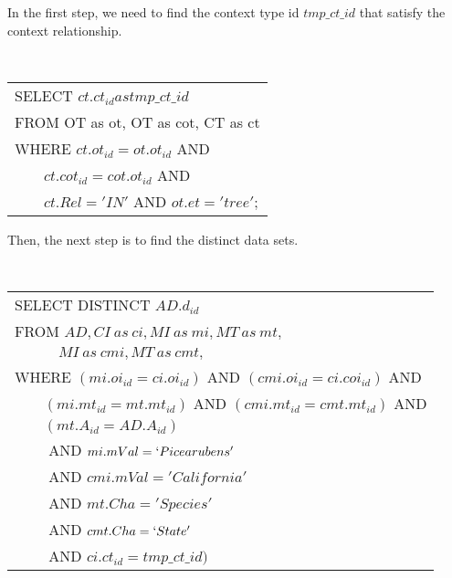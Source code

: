 
In the first step, we need to find the context type id $tmp\_ct\_id$
that satisfy the context relationship.

{\tt
\begin{tabular}{l}
SELECT $ct.ct_{id} as tmp\_ct\_id$\\
FROM OT as ot, OT as cot, CT as ct\\
WHERE $ct.ot_{id} = ot.ot_{id}$ AND \\
      $\qquad ct.cot_{id}= cot.ot_{id}$ AND \\
      $\qquad ct.Rel='IN'$ AND $ot.et='tree'$;
\end{tabular}
}

Then, the next step is to find the distinct data sets.

\vspace{0.1in}
{\tt
\begin{tabular}{l}
SELECT DISTINCT $AD.d_{id}$\\
FROM $AD, CI~as~ci, MI~as~mi, MT~as~mt,$ \\
$\quad\qquad MI~as~cmi, MT~as~cmt,$ \\
WHERE $(mi.oi_{id}=ci.oi_{id})$ AND $(cmi.oi_{id}=ci.coi_{id})$ AND\\
$\qquad (mi.mt_{id}=mt.mt_{id})$ AND $(cmi.mt_{id}=cmt.mt_{id})$ AND\\
$\qquad (mt.A_{id}=AD.A_{id})$\\
$\qquad$ AND $mi.mVal=`Picea rubens'$ \\
$\qquad$ AND $cmi.mVal='California'$\\
$\qquad$ AND $mt.Cha = 'Species'$\\
$\qquad$ AND $cmt.Cha=`State'$\\
$\qquad$ AND $ci.ct_{id} = tmp\_ct\_id)$\\
\end{tabular}
}
\vspace{0.1in}





